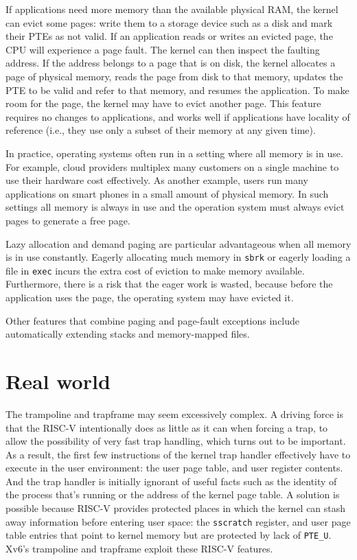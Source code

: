 If applications need more
memory than the available physical RAM,
the kernel can evict some pages: write
them to a storage device such as a disk and mark their
PTEs as not valid. If an application reads
or writes an
evicted page, the CPU will experience a page fault. The kernel can
then inspect the faulting address. If the address belongs to a page
that is on disk, the kernel allocates a page of physical
memory,
reads the page from disk to that memory, updates
the PTE to be valid and refer to that memory,
and resumes the application. To make room for the page,
the kernel may have to evict another page.  This feature requires no
changes to applications, and works well if applications have locality
of reference (i.e., they use only a subset of their memory
at any given time).

In practice, operating systems often run in a setting where all memory
is in use. For example, cloud providers multiplex many customers on a
single machine to use their hardware cost effectively. As another
example, users run many applications on smart phones in a small amount
of physical memory.  In such settings all memory is always in use and
the operation system must always evict pages to generate a free page.

Lazy allocation and demand paging are particular advantageous when all
memory is in use constantly.  Eagerly allocating much memory in
\lstinline{sbrk} or eagerly loading a file in \lstinline{exec}
incurs the extra cost of eviction to make memory available.
Furthermore, there is a risk that the eager work is wasted, because
before the application uses the page, the operating system may have
evicted it.

Other features that combine paging and page-fault exceptions include
automatically extending stacks and memory-mapped files.

\section{Real world}

The trampoline and trapframe may seem excessively complex. A driving
force is that the RISC-V intentionally does as little as it can when
forcing a trap, to allow the possibility of very fast trap handling,
which turns out to be important. As a result, the first few
instructions of the kernel trap handler effectively have to execute in
the user environment: the user page table, and user register contents.
And the trap handler is initially ignorant of useful facts such as the
identity of the process that's running or the address of the kernel
page table. A solution is possible because RISC-V provides protected
places in which the kernel can stash away information before entering
user space: the {\tt sscratch} register, and user page table entries
that point to kernel memory but are protected by lack of \lstinline{PTE_U}.
Xv6's trampoline and trapframe exploit these RISC-V features.

